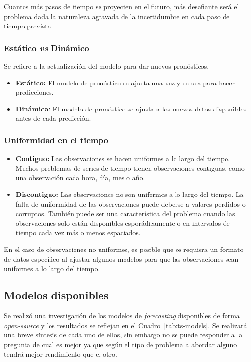 \documentclass[a4paper,12pt]{article}
\begin{document}
Cuantos más pasos de tiempo se proyecten en el futuro, más desafiante será el problema dada la naturaleza agravada de la incertidumbre en cada paso de tiempo previsto.

\subsubsection{Estático \textit{vs} Dinámico}
Se refiere a la actualización del modelo para dar nuevos pronósticos.
\begin{itemize}[noitemsep, topsep=2pt]
	\item \textbf{Estático:} El modelo de pronóstico se ajusta una vez y se usa para hacer predicciones.
	\item \textbf{Dinámica:} El modelo de pronóstico se ajusta a los nuevos datos disponibles antes de cada predicción.
\end{itemize}

\subsubsection{Uniformidad en el tiempo}
\begin{itemize}[noitemsep, topsep=2pt]
	\item \textbf{Contiguo:} Las observaciones se hacen uniformes a lo largo del tiempo. Muchos problemas de series de tiempo tienen observaciones contiguas, como una observación cada hora, día, mes o año.
	\item \textbf{Discontiguo:} Las observaciones no son uniformes a lo largo del tiempo. La falta de uniformidad de las observaciones puede deberse a valores perdidos o corruptos. También puede ser una característica del problema cuando las observaciones solo están disponibles esporádicamente o en intervalos de tiempo cada vez más o menos espaciados.
\end{itemize}

En el caso de observaciones no uniformes, es posible que se requiera un formato de datos específico al ajustar algunos modelos para que las observaciones sean uniformes a lo largo del tiempo.

\clearpage

\subsection{Modelos disponibles}

Se realizó una investigación de los modelos de \textit{forecasting} disponibles de forma \textit{open-source} y los resultados se reflejan en el Cuadro~\ref{tab:ts-models}. Se realizará una breve síntesis de cada uno de ellos, sin embargo no se puede responder a la pregunta de cual es mejor ya que según el tipo de problema a abordar alguno tendrá mejor rendimiento que el otro.
\end{document}
